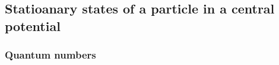 \subsection{Statioanary states of a particle in a central potential}
\subsubsection{Quantum numbers}

























